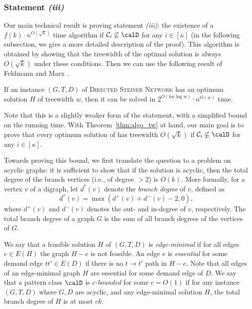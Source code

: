 \subsubsection*{Statement \textit{(iii)}}

  Our main technical result is proving statement \textit{(iii)}: the existence of a
$f(k)\cdot n^{O(\sqrt{k})}$ time algorithm if
$\mathcal{C}_i\not\subseteq \calD$ for any $i\in[\kappa]$ (in the following subsection, we give a more detailed description of the proof). This
algorithm is obtained by showing that the treewidth of the
optimal solution is always $O(\sqrt{k})$ under these
conditions. Then we can use the following result of Feldmann and Marx \cite{FeldmannM16}.

  \begin{theorem}\label{thm:algo_tw}
    If an instance $(G,T,D)$ of \textsc{Directed Steiner Network} has an optimum solution $H$ of treewidth $w$, then it can be solved in $2^{O(kw \log w)} \cdot n^{O(w)}$ time. 
  \end{theorem}
  
  Note that this is a slightly weaker form of the statement, with a simplified bound on the running time. With Theorem~\ref{thm:algo_tw} at hand, our main goal is to prove that every optimum solution of \Dsn has treewidth $O(\sqrt{k})$ if $\mathcal{C}_i\not\subseteq \calD$ for any $i\in [\kappa]$.
  
Towards proving this bound, we first translate the
question to a problem on acyclic graphs: it is sufficient to show that
if the solution is acyclic, then the total degree of the branch
vertices (i.e., of degree $>2$) is $O(k)$. More formally,
for a vertex $v$ of a digraph, let $d^*(v)$ denote the \emph{branch degree} of $v$, defined as 
\[d^*(v)=\max(d^+(v)+d^-(v)-2,0),\]
where $d^+(v)$ and $d^-(v)$ denotes the out- and in-degree of $v$, respectively. The total branch degree of a graph $G$ is the sum of all branch degrees of the vertices of $G$.

We say that a feasible solution $H$ of $(G,T,D)$ is \emph{edge-minimal} if for all edges $e\in E(H)$ the graph $H-e$ is not feasible. An edge $e$ is \emph{essential} for some demand edge $tt'\in E(D)$ if there is no $t\rightarrow t'$ path in $H-e$. Note that all edges of an edge-minimal graph $H$ are essential for some demand edge of $D$.
We say that a pattern class $\calD$ is \emph{$c$-bounded} for some $c=O(1)$ if for any instance $(G,T,D)$ \Dsnfull where $G,D$ are acyclic, and any edge-minimal solution $H$, the total branch degree of $H$ is at most $ck$.

